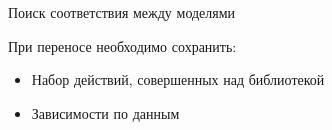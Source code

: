 \documentclass[12pt]{beamer}
\begin{document}
{
\begin{frame}{Поиск соответствия между моделями}
  \begin{mybox}[]
  	При переносе необходимо сохранить:
  	  \begin{itemize}
  	  	\item Набор действий, совершенных над библиотекой
  	  	\item Зависимости по данным
  	  \end{itemize}
  \end{mybox}
\end{frame}
}
\end{document}
